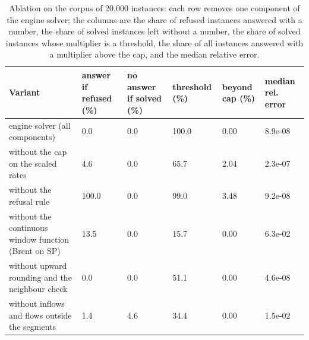 \begin{table}[htbp]
\centering
\small
\setlength{\tabcolsep}{3pt}
\caption{Ablation on the corpus of 20,000 instances: each row removes one component of the engine solver; the columns are the share of refused instances answered with a number, the share of solved instances left without a number, the share of solved instances whose multiplier is a threshold, the share of all instances answered with a multiplier above the cap, and the median relative error.}
\label{tab:ablation}
\begin{tabular}{p{4.4cm}p{1.9cm}p{1.9cm}p{1.9cm}p{1.9cm}p{1.9cm}}
\toprule
Variant & answer if refused (\%) & no answer if solved (\%) & threshold (\%) & beyond cap (\%) & median rel. error \\
\midrule
engine solver (all components) & 0.0 & 0.0 & 100.0 & 0.00 & 8.9e-08 \\
without the cap on the scaled rates & 4.6 & 0.0 & 65.7 & 2.04 & 2.3e-07 \\
without the refusal rule & 100.0 & 0.0 & 99.0 & 3.48 & 9.2e-08 \\
without the continuous window function (Brent on SP) & 13.5 & 0.0 & 15.7 & 0.00 & 6.3e-02 \\
without upward rounding and the neighbour check & 0.0 & 0.0 & 51.1 & 0.00 & 4.6e-08 \\
without inflows and flows outside the segments & 1.4 & 4.6 & 34.4 & 0.00 & 1.5e-02 \\
\bottomrule
\end{tabular}
\end{table}
